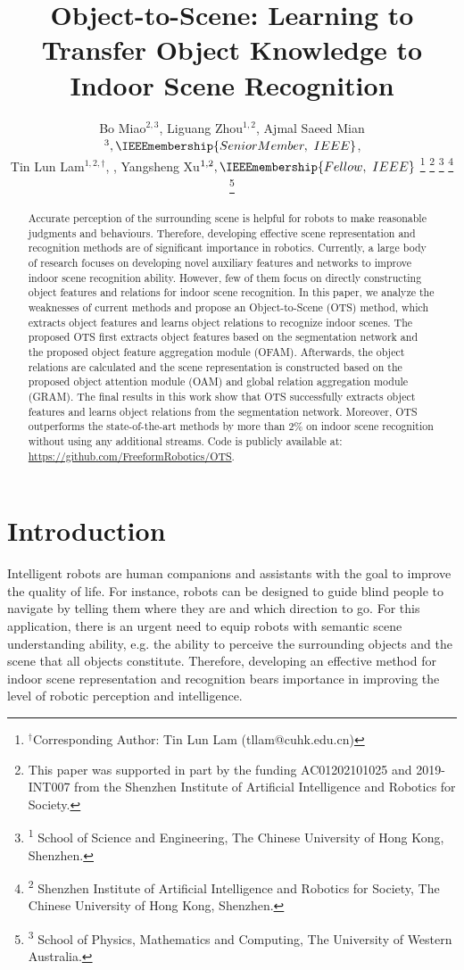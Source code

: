 \documentclass[letterpaper, 10 pt, conference]{ieeeconf}  %
\title{\LARGE \bf
Object-to-Scene: Learning to Transfer Object Knowledge to Indoor Scene Recognition}
\author{Bo Miao$^{2,3}$, Liguang Zhou$^{1,2}$, Ajmal Saeed Mian$^{3}, \IEEEmembership{Senior Member,~IEEE}$, \\
Tin Lun Lam$^{1,2,\dagger}$, \IEEEmembership{Senior Member,~IEEE}, Yangsheng Xu$^{1,2}, \IEEEmembership{Fellow,~IEEE}$
\thanks{$^{\dagger}$Corresponding Author: Tin Lun Lam (tllam@cuhk.edu.cn)}
\thanks{This paper was supported in part by the funding AC01202101025 and 2019-INT007 from the Shenzhen Institute of Artificial Intelligence and Robotics for Society.}
\thanks{\textsuperscript{1} School of Science and Engineering, The Chinese University of Hong Kong, Shenzhen.}
\thanks{\textsuperscript{2} Shenzhen Institute of Artificial Intelligence and Robotics for Society, The Chinese University of Hong Kong, Shenzhen.}
\thanks{\textsuperscript{3} School of Physics, Mathematics and Computing, The University of Western Australia.}
}
\begin{document}
\maketitle
\thispagestyle{empty}
\pagestyle{empty}

\begin{abstract}
Accurate perception of the surrounding scene is helpful for robots to make reasonable judgments and behaviours. Therefore, developing effective scene representation and recognition methods are of significant importance in robotics. Currently, a large body of research focuses on developing novel auxiliary features and networks to improve indoor scene recognition ability. However, few of them focus on directly constructing object features and relations for indoor scene recognition. In this paper, we analyze the weaknesses of current methods and propose an Object-to-Scene (OTS) method, which extracts object features and learns object relations to recognize indoor scenes. The proposed OTS first extracts object features based on the segmentation network and the proposed object feature aggregation module (OFAM). Afterwards, the object relations are calculated and the scene representation is constructed based on the proposed object attention module (OAM) and global relation aggregation module (GRAM). The final results in this work show that OTS successfully extracts object features and learns object relations from the segmentation network. Moreover, OTS outperforms the state-of-the-art methods by more than 2\% on indoor scene recognition without using any additional streams. Code is publicly available at: \url{https://github.com/FreeformRobotics/OTS}.
\end{abstract}



\section{Introduction}
\label{Introduction}
Intelligent robots are human companions and assistants with the goal to improve the quality of life. For instance, robots can be designed to guide blind people to navigate by telling them where they are and which direction to go. For this application, there is an urgent need to equip robots with semantic scene understanding ability, e.g. the ability to perceive the surrounding objects and the scene that all objects constitute. Therefore, developing an effective method for indoor scene representation and recognition bears importance in improving the level of robotic perception and intelligence.
\end{document}
